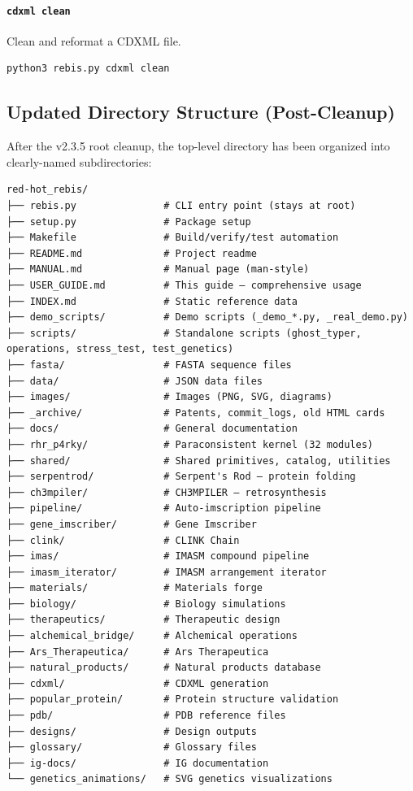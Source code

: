 \hypertarget{cdxml-clean}{%
\paragraph{\texorpdfstring{\texttt{cdxml\ clean}}{cdxml clean}}\label{cdxml-clean}}

Clean and reformat a CDXML file.

\begin{verbatim}
python3 rebis.py cdxml clean
\end{verbatim}

\hypertarget{updated-directory-structure-post-cleanup}{%
\subsection{Updated Directory Structure
(Post-Cleanup)}\label{updated-directory-structure-post-cleanup}}

After the v2.3.5 root cleanup, the top-level directory has been
organized into clearly-named subdirectories:

\begin{verbatim}
red-hot_rebis/
├── rebis.py               # CLI entry point (stays at root)
├── setup.py               # Package setup
├── Makefile               # Build/verify/test automation
├── README.md              # Project readme
├── MANUAL.md              # Manual page (man-style)
├── USER_GUIDE.md          # This guide — comprehensive usage
├── INDEX.md               # Static reference data
├── demo_scripts/          # Demo scripts (_demo_*.py, _real_demo.py)
├── scripts/               # Standalone scripts (ghost_typer, operations, stress_test, test_genetics)
├── fasta/                 # FASTA sequence files
├── data/                  # JSON data files
├── images/                # Images (PNG, SVG, diagrams)
├── _archive/              # Patents, commit_logs, old HTML cards
├── docs/                  # General documentation
├── rhr_p4rky/             # Paraconsistent kernel (32 modules)
├── shared/                # Shared primitives, catalog, utilities
├── serpentrod/            # Serpent's Rod — protein folding
├── ch3mpiler/             # CH3MPILER — retrosynthesis
├── pipeline/              # Auto-imscription pipeline
├── gene_imscriber/        # Gene Imscriber
├── clink/                 # CLINK Chain
├── imas/                  # IMASM compound pipeline
├── imasm_iterator/        # IMASM arrangement iterator
├── materials/             # Materials forge
├── biology/               # Biology simulations
├── therapeutics/          # Therapeutic design
├── alchemical_bridge/     # Alchemical operations
├── Ars_Therapeutica/      # Ars Therapeutica
├── natural_products/      # Natural products database
├── cdxml/                 # CDXML generation
├── popular_protein/       # Protein structure validation
├── pdb/                   # PDB reference files
├── designs/               # Design outputs
├── glossary/              # Glossary files
├── ig-docs/               # IG documentation
└── genetics_animations/   # SVG genetics visualizations
\end{verbatim}

